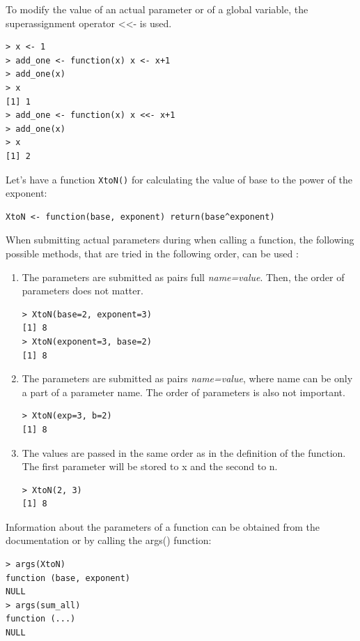 To modify the value of an actual parameter or of a global variable, the superassignment operator <<- is used.

\begin{verbatim}
> x <- 1
> add_one <- function(x) x <- x+1
> add_one(x)
> x
[1] 1
> add_one <- function(x) x <<- x+1
> add_one(x)
> x
[1] 2
\end{verbatim}

Let’s have a function \texttt{XtoN()} for calculating the value of base to the power
of the exponent:

\begin{verbatim}
XtoN <- function(base, exponent) return(base^exponent)
\end{verbatim}

When submitting actual parameters during when calling a function, the following possible methods, that are tried in the following order, can be used
\cite{ref213, ref4}:

\begin{enumerate}
    \item  The parameters are submitted as pairs full \textit{name=value}. Then, the order
of parameters does not matter.

\begin{verbatim}
> XtoN(base=2, exponent=3)
[1] 8
> XtoN(exponent=3, base=2)
[1] 8

\end{verbatim}

    \item  The parameters are submitted as pairs \textit{name=value}, where name can be
only a part of a parameter name. The order of parameters is also not important.

\begin{verbatim}
> XtoN(exp=3, b=2)
[1] 8
\end{verbatim}

    \item  The values are passed in the same order as in the definition of the function.
The first parameter will be stored to x and the second to n.

\begin{verbatim}
> XtoN(2, 3)
[1] 8
\end{verbatim}
\end{enumerate}

Information about the parameters of a function can be obtained from the documentation or by calling the args() function:

\begin{verbatim}
> args(XtoN)
function (base, exponent)
NULL
> args(sum_all)
function (...)
NULL
\end{verbatim}

